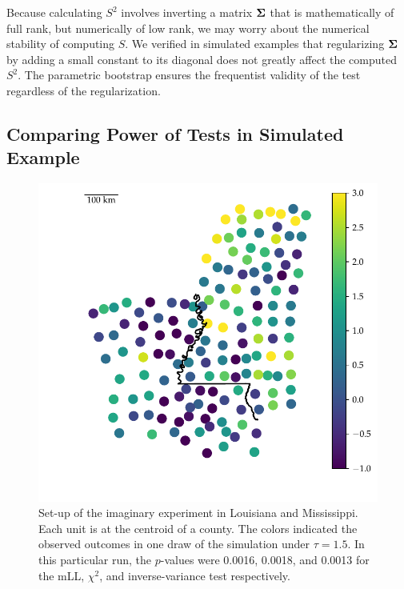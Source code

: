     Because calculating \(S^2\) involves inverting a matrix \(\bm{\Sigma}\) that is mathematically of full rank, but numerically of low rank, we may worry about the numerical stability of computing \(S\).
We verified in simulated examples that regularizing \(\bm{\Sigma}\) by adding a small constant to its diagonal does not greatly affect the computed \(S^2\).
The parametric bootstrap ensures the frequentist validity of the test
regardless of the regularization.


\subsection{Comparing Power of Tests in Simulated Example}
\label{sec:powersim}

\begin{figure}[tb]
    \centering
    \includegraphics[height=0.4\textheight]{figures/mississippi_sim.pdf}
    \caption{
        \label{fig:mississippi_counties}
        Set-up of the imaginary experiment in Louisiana and Mississippi. Each unit is at the centroid of a county. The colors indicated the observed outcomes in one draw of the simulation under \(\tau=1.5\). In this particular run, the \(p\)-values were 0.0016, 0.0018, and 0.0013 for the mLL, \(\chi^2\), and inverse-variance test respectively.}
\end{figure}


